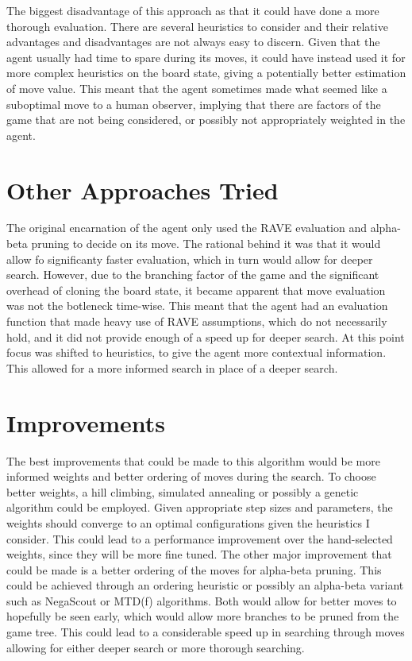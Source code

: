 \documentclass[11 pt, letter paper]{article}
\begin{document}
        The biggest disadvantage of this approach as that it could have done a more thorough evaluation.
        There are several heuristics to consider and their relative advantages and disadvantages are not always easy to discern.
        Given that the agent usually had time to spare during its moves, it could have instead used it for more complex
        heuristics on the board state, giving a potentially better estimation of move value. This meant that the agent sometimes made what seemed like a suboptimal move to
        a human observer, implying that there are factors of the game that are not being considered, or possibly not appropriately weighted in the agent.

    \section{Other Approaches Tried}
        The original encarnation of the agent only used the RAVE evaluation and alpha-beta pruning to decide on its move.
        The rational behind it was that it would allow fo significanty faster evaluation,
        which in turn would allow for deeper search. However, due to the branching factor of the game and the significant overhead
        of cloning the board state, it became apparent that move evaluation was not the botleneck time-wise.
        This meant that the agent had an evaluation function that made heavy use of RAVE assumptions, which do not necessarily hold,
        and it did not provide enough of a speed up for deeper search. At this point focus was shifted to heuristics,
        to give the agent more contextual information. This allowed for a more informed search in place of a deeper search.

    \section{Improvements}
        The best improvements that could be made to this algorithm would be more informed weights and better ordering of moves during the search.
        To choose better weights, a hill climbing, simulated annealing or possibly a genetic algorithm could be employed.
        Given appropriate step sizes and parameters, the weights should converge to an optimal configurations given the heuristics I consider.
        This could lead to a performance improvement over the hand-selected weights, since they will be more fine tuned.
        The other major improvement that could be made is a better ordering of the moves for alpha-beta pruning.
        This could be achieved through an ordering heuristic or possibly an alpha-beta variant such as NegaScout or MTD(f) algorithms.
        Both would allow for better moves to hopefully be seen early, which would allow more branches to be pruned from the game tree.
        This could lead to a considerable speed up in searching through moves allowing for either deeper search or more thorough searching.
\end{document}
